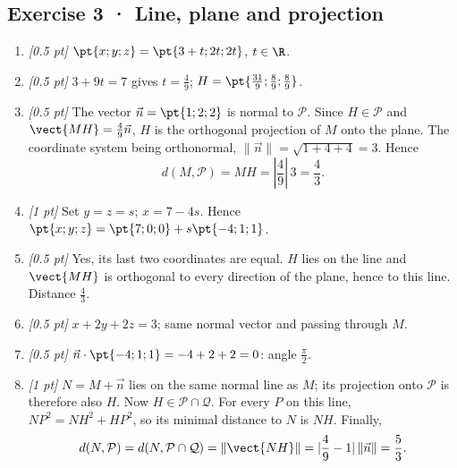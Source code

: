 \subsection*{Exercise 3 · Line, plane and projection}\begin{enumerate}

\item \textit{[0.5 pt]} $\pt{x;y;z}=\pt{3+t;2t;2t}$, $t\in\R$.

\item \textit{[0.5 pt]} $3+9t=7$ gives $t=\frac{4}{9}$; $H=\pt{\frac{31}{9};\frac{8}{9};\frac{8}{9}}$.

\item \textit{[0.5 pt]} The vector $\vec n=\pt{1;2;2}$ is normal to $\mathcal P$. Since $H\in\mathcal P$ and $\vect{MH}=\frac{4}{9}\vec n$, $H$ is the orthogonal projection of $M$ onto the plane. The coordinate system being orthonormal, $\|\vec n\|=\sqrt{1+4+4}=3$. Hence
\[d(M,\mathcal P)=MH=|\frac{4}{9}|\,3=\frac{4}{3}.\]

\item \textit{[1 pt]} Set $y=z=s$; $x=7-4s$. Hence $\pt{x;y;z}=\pt{7;0;0}+s\pt{-4;1;1}$.

\item \textit{[0.5 pt]} Yes, its last two coordinates are equal. $H$ lies on the line and $\vect{MH}$ is orthogonal to every direction of the plane, hence to this line. Distance $\frac{4}{3}$.

\item \textit{[0.5 pt]} $x+2y+2z=3$; same normal vector and passing through $M$.

\item \textit{[0.5 pt]} $\vec n\cdot\pt{-4;1;1}=-4+2+2=0$: angle $\frac{\pi}{2}$.

\item \textit{[1 pt]} $N=M+\vec n$ lies on the same normal line as $M$; its projection onto $\mathcal P$ is therefore also $H$. Now $H\in\mathcal P\cap\mathcal Q$. For every $P$ on this line, $NP^2=NH^2+HP^2$, so its minimal distance to $N$ is $NH$. Finally,
\[d(N,\mathcal P)=d(N,\mathcal P\cap\mathcal Q)=\|\vect{NH}\|=|\frac{4}{9}-1|\,\|\vec n\|=\frac{5}{3}.\]

\end{enumerate}

